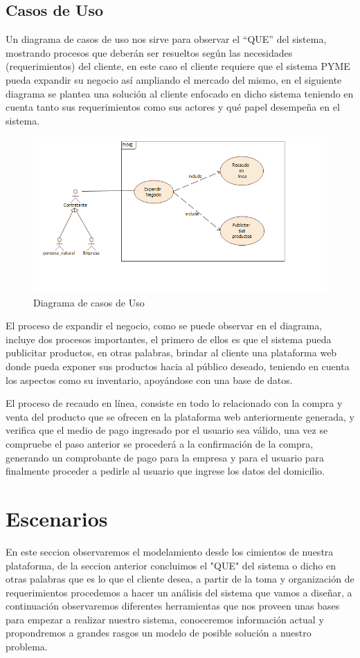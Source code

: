 \subsection{Casos de Uso}

Un diagrama de casos de uso nos sirve para observar el “QUE” del sistema, mostrando procesos que deberán ser resueltos según las necesidades (requerimientos) del cliente, en este caso el cliente requiere que el sistema PYME pueda expandir su negocio así ampliando el mercado del mismo, en el siguiente diagrama se plantea una solución al cliente enfocado en dicho sistema teniendo en cuenta tanto sus requerimientos como sus actores y qué papel desempeña en el sistema.


\begin{figure}[th!]
	\centering
	\includegraphics[width=0.7\linewidth]{arquitectura/imagenes/casosDeUso}
	\caption{Diagrama de  casos de Uso}
\end{figure}

El proceso de expandir el negocio, como  se puede observar en el diagrama, incluye dos procesos importantes, el primero de ellos es que el sistema pueda publicitar productos, en otras palabras,  brindar al cliente una plataforma web donde pueda exponer sus productos hacia al público deseado, teniendo en cuenta los aspectos como su inventario, apoyándose con una base de datos.

El proceso de recaudo en línea, consiste en todo lo relacionado con la compra y venta del producto que se ofrecen en la plataforma web anteriormente generada, y verifica que el medio de pago ingresado por el usuario sea válido, una vez se compruebe el paso anterior se procederá a la confirmación de la compra, generando un comprobante de pago para la empresa y para el usuario para finalmente  proceder a pedirle al usuario que ingrese los datos del domicilio.


\newpage


\section{Escenarios}
En este seccion observaremos el modelamiento desde los cimientos de nuestra plataforma, de la seccion anterior concluimos el "QUE" del sistema o dicho en otras palabras que es lo que el cliente desea, a partir de la toma y organización de requerimientos procedemos a hacer un análisis del sistema que vamos a diseñar, a continuación observaremos diferentes herramientas que nos proveen unas bases para empezar a realizar nuestro sistema, conoceremos información actual y propondremos a grandes rasgos un modelo de posible solución a nuestro problema. 


